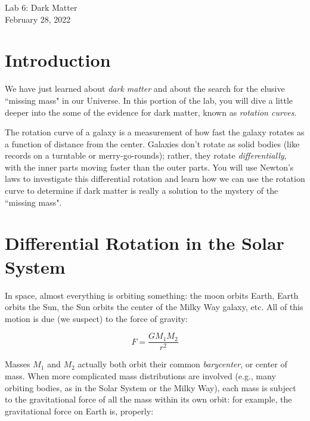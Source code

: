 \documentclass[11pt]{article}%
\begin{document}
\begin{center}
\huge{Lab 6: Dark Matter}\\ \medskip \Large{February 28, 2022}
\end{center}

\section{Introduction}
\noindent
We have just learned about \textit{dark matter} and about the search for the elusive ``missing mass" in our Universe.  In this portion of the lab, you will dive a little deeper into the some of the evidence for dark matter, known as \textit{rotation curves}.

\medskip \noindent
The rotation curve of a galaxy is a measurement of how fast the galaxy rotates as a function of distance from the center.  Galaxies don't rotate as solid bodies (like records on a turntable or merry-go-rounds); rather, they rotate \textit{differentially}, with the inner parts moving faster than the outer parts. You will use Newton's laws to investigate this differential rotation and learn how we can use the rotation curve to determine if dark matter is really a solution to the mystery of the ``missing mass".

\section{Differential Rotation in the Solar System}
\noindent
In space, almost everything is orbiting something: the moon orbits Earth, Earth orbits the Sun, the Sun orbits the center of the Milky Way galaxy, etc. All of this motion is due (we suspect) to the force of gravity:

\begin{equation}
F = \frac{G M_1 M_2}{r^2}
\end{equation}

\noindent Masses $M_1$ and $M_2$ actually both orbit their common \textit{barycenter}, or center of mass. When more complicated mass distributions are involved (e.g., many orbiting bodies, as in the Solar System or the Milky Way), each mass is subject to the gravitational force of all the mass within its own orbit: for example, the gravitational force on Earth is, properly:
\end{document}
